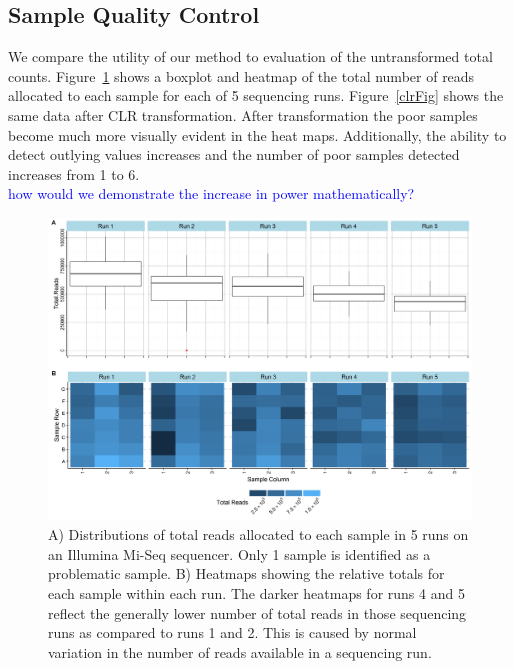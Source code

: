 \documentclass{article}\usepackage[]{graphicx}\usepackage[]{color}
\theoremstyle{definition}
\begin{document}
\subsection{Sample Quality Control}

We compare the utility of our method to evaluation of the untransformed total counts.  Figure~\ref{totalFig} shows a boxplot and heatmap of the total number of reads allocated to each sample for each of 5 sequencing runs.  Figure~\ref{clrFig} shows the same data after CLR transformation.  After transformation the poor samples become much more visually evident in the heat maps.  Additionally, the ability to detect outlying values increases and the number of poor samples detected increases from 1 to 6.  \\
\textcolor{blue}{how would we demonstrate the increase in power mathematically?}

\begin{figure}
\includegraphics[scale=.5]{./Figures/IO_Repro_Combined_RawTotals}
\caption{A) Distributions of total reads allocated to each sample in 5 runs on an Illumina Mi-Seq sequencer. Only 1 sample is identified as a problematic sample. B) Heatmaps showing the relative totals for each sample within each run.  The darker heatmaps for runs 4 and 5 reflect the generally lower number of total reads in those sequencing runs as compared to runs 1 and 2.  This is caused by normal variation in the number of reads available in a sequencing run.}
\label{totalFig}
\end{figure}
 
\end{document}
